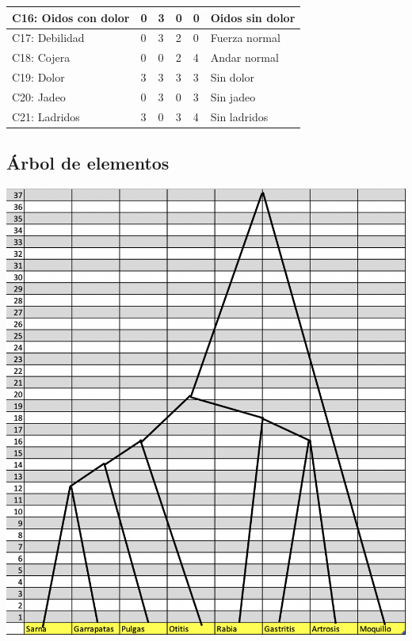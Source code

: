\documentclass[a4paper,table,xcdraw]{article}
\begin{document}
\begin{longtable}{|l|l|l|l|l|l|}
C16: Oidos con dolor          & 0     & 3        & 0         & 0        & Oidos sin dolor        \\ \hline
C17: Debilidad                & 0     & 3        & 2         & 0        & Fuerza normal          \\ \hline
C18: Cojera                   & 0     & 0        & 2         & 4        & Andar normal           \\ \hline
C19: Dolor                    & 3     & 3        & 3         & 3        & Sin dolor              \\ \hline
C20: Jadeo                    & 0     & 3        & 0         & 3        & Sin jadeo              \\ \hline
C21: Ladridos                 & 3     & 0        & 3         & 4        & Sin ladridos           \\ \hline
\end{longtable}

\subsection{Árbol de elementos}
\includegraphics[scale=0.8]{./img/arbol1.png}
\end{document}
